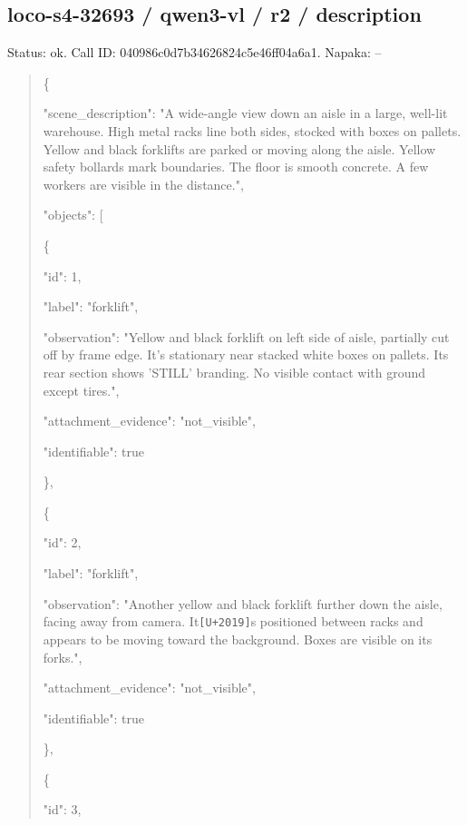 \documentclass[10pt,a4paper]{article}
\begin{document}
\subsection*{loco-s4-32693 / qwen3-vl / r2 / description}
Status: ok. Call ID: 040986c0d7b34626824c5e46ff04a6a1. Napaka: --
\begin{quote}\footnotesize
\{\par
  "scene\_description":\allowbreak{} "A wide-angle view down an aisle in a large,\allowbreak{} well-lit warehouse. High metal racks line both sides,\allowbreak{} stocked with boxes on pallets. Yellow and black forklifts are parked or moving along the aisle. Yellow safety bollards mark boundaries. The floor is smooth concrete. A few workers are visible in the distance.",\allowbreak{}\par
  "objects":\allowbreak{} [\par
    \{\par
      "id":\allowbreak{} 1,\allowbreak{}\par
      "label":\allowbreak{} "forklift",\allowbreak{}\par
      "observation":\allowbreak{} "Yellow and black forklift on left side of aisle,\allowbreak{} partially cut off by frame edge. It's stationary near stacked white boxes on pallets. Its rear section shows 'STILL' branding. No visible contact with ground except tires.",\allowbreak{}\par
      "attachment\_evidence":\allowbreak{} "not\_visible",\allowbreak{}\par
      "identifiable":\allowbreak{} true\par
    \},\allowbreak{}\par
    \{\par
      "id":\allowbreak{} 2,\allowbreak{}\par
      "label":\allowbreak{} "forklift",\allowbreak{}\par
      "observation":\allowbreak{} "Another yellow and black forklift further down the aisle,\allowbreak{} facing away from camera. It\texttt{[U+2019]}s positioned between racks and appears to be moving toward the background. Boxes are visible on its forks.",\allowbreak{}\par
      "attachment\_evidence":\allowbreak{} "not\_visible",\allowbreak{}\par
      "identifiable":\allowbreak{} true\par
    \},\allowbreak{}\par
    \{\par
      "id":\allowbreak{} 3,\allowbreak{}\par

\end{quote}
\end{document}
